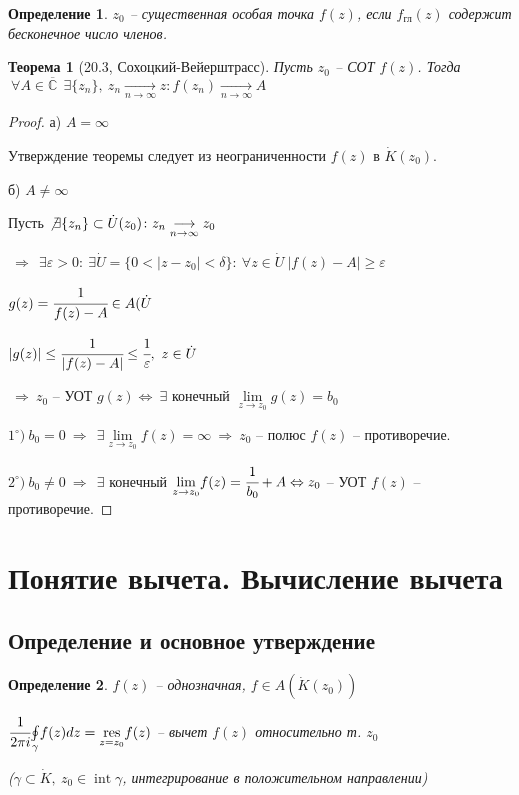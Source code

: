 \documentclass[draft]{article}
\newcommand{\res}{\mathop{\mathrm{res}}\nolimits}
\newcommand{\then}{\ \Rightarrow\ }
\renewcommand{\C}{\mathbb{C}}
\newcommand{\moint}[1]{\underset{#1}{\oint}}
\newcommand{\mlim}[1]{\underset{#1}{\lim}}
\newcommand{\mres}[1]{\underset{#1}{\res}}
\newcommand{\LRA}{\Leftrightarrow}
\renewcommand{\bar}{\overline}
\newcommand{\Int}{\mathop{\mathrm{int}}\nolimits}
\newcommand{\g}{\gamma}
\newcommand{\e}{\varepsilon}
\newcommand{\E}{\ \exists}
\newcommand{\F}{\ \forall}
\newcommand{\CC}{\bar{\C}}
\newcommand{\opr}[1]{\begin{opred}#1\end{opred}}
\newcommand{\lra}[1]{\underset{#1}{\longrightarrow}}
\newtheorem*{theor}{Теорема}
\newtheorem*{opred}{Определение}
\theoremstyle{remark}
\begin{document}
\opr{$z_0$ -- существенная особая точка $f(z)$, если $f_{\mbox{гл}}(z)$ содержит бесконечное число членов.}

\begin{theor}[20.3, Сохоцкий-Вейерштрасс]
Пусть $z_0$ -- СОТ $f(z)$. Тогда $\F A\in\CC\ \E\{z_n\},\ z_n\lra{n\to\infty}z\colon f(z_n)\lra{n\to\infty}A$
\end{theor}
\begin{proof}
а) $A=\infty$

Утверждение теоремы следует из неограниченности $f(z)$ в $\dot{K}(z_0)$.

б) $A\neq\infty$

Пусть $\not\exists\{z_n\}\subset \dot{U}(z_0)\colon z_n\lra{n\to\infty}z_0$

$\then \E \e>0\colon\E \dot{U}=\{0<|z-z_0|<\delta\}\colon\F z\in \dot{U}\ |f(z)-A|\geq \e$

$g(z)=\cfrac1{f(z)-A}\in A(\dot{U}$

$|g(z)|\leq\cfrac1{|f(z)-A|}\leq\cfrac1\e,\ z\in\dot{U}$

$\then z_0$ -- УОТ $g(z) \LRA \E$ конечный $\mlim{z\to z_0}g(z)=b_0$

$1^\circ)\ b_0=0\then \E\mlim{z\to z_0}f(z)=\infty\then z_0$ -- полюс $f(z)$ -- противоречие.

$2^\circ)\ b_0\neq0\then\E$ конечный $\mlim{z\to z_0}f(z)=\cfrac1{b_0}+A \LRA z_0$ -- УОТ $f(z)$ -- противоречие.
\end{proof}


\newpage

\section{Понятие вычета. Вычисление вычета}

\subsection{Определение и основное утверждение}

\opr{$f(z)$ -- однозначная, $f\in A(\dot{K}(z_0))$

$\cfrac1{2\pi i}\moint{\g}f(z)dz=\mres{z=z_0}f(z)$ -- вычет $f(z)$ относительно т. $z_0$

($\g\subset\dot{K},\ z_0\in\Int\g$, интегрирование в положительном направлении)}
\end{document}
